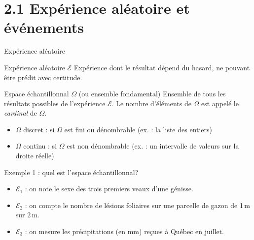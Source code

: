 \documentclass{BeamerTemplate}
\begin{document}
\section[Expérience aléatoire]{2.1 Expérience aléatoire et événements}

\begin{frame}[t]{Expérience aléatoire}
  \begin{Boite}{Expérience aléatoire $\mathcal{E}$}
    Expérience dont le résultat dépend du hasard, ne pouvant être prédit avec
    certitude.
  \end{Boite}

  \begin{Boite}{Espace échantillonnal $\Omega$ (ou ensemble fondamental)}
    Ensemble de tous les résultats possibles de l'expérience $\mathcal{E}$.
    Le nombre d'éléments de $\Omega$ est appelé le \emph{cardinal} de $\Omega$.
  \end{Boite}

  \begin{itemize}
    \item \alert{$\Omega$ discret} : si $\Omega$ est fini ou dénombrable
      (ex. : la liste des entiers)
    \item \alert{$\Omega$ continu} : si $\Omega$ est non dénombrable
      (ex. : un intervalle de valeurs sur la droite réelle)
  \end{itemize}
\end{frame}

\begin{frame}[t]{Exemple 1 : quel est l'espace échantillonnal?}
  \begin{itemize}\itemsep 7mm
    \item $\mathcal{E}_1$ : on note le sexe des trois premiers veaux d'une génisse.
    \item $\mathcal{E}_2$ : on compte le nombre de lésions foliaires sur une
      parcelle de gazon de 1\,m sur 2\,m.
    \item $\mathcal{E}_3$ : on mesure les précipitations (en mm) reçues à
      Québec en juillet.
      \uncover<4->{\alert{$\Rightarrow \Omega_3 = [0, \infty)$}}
  \end{itemize}

  \bigskip
\end{frame}
\end{document}

